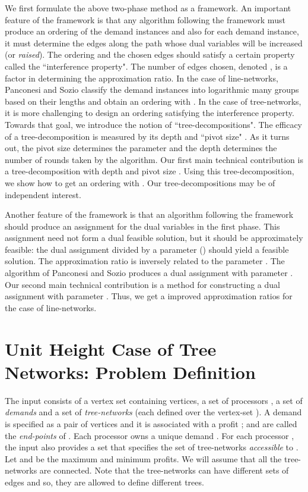 \documentclass[11pt]{article}
\begin{document}
We first formulate the above two-phase method as a framework.
An important feature of the framework is that any algorithm following the framework
must produce an ordering of the demand instances and also for each demand instance,
it must determine the edges along the path whose dual variables will be increased (or {\em raised}).
The ordering and the chosen edges should satisfy a certain property called the ``interference property".
The number of edges chosen, denoted , is a factor in determining the approximation ratio.
In the case of line-networks, Panconesi and Sozio \cite{Pancj} 
classify the demand instances into logarithmic many groups based on their lengths
and obtain an ordering with .
In the case of tree-networks, it is more challenging to design an ordering
satisfying the interference property. Towards that goal, we introduce the notion of
``tree-decompositions". 
The efficacy of a tree-decomposition is measured by its
depth and ``pivot size" . As it turns out, the pivot size  determines the parameter 
and the depth determines the number of rounds taken by the algorithm. 
Our first main technical contribution is a tree-decomposition with depth  and
pivot size . Using this tree-decomposition, we show how to get an ordering with .
Our tree-decompositions may be of independent interest.

Another feature of the framework is that an algorithm following the framework should
produce an assignment for the dual variables in the first phase.
This assignment need not form a dual feasible solution, but it should be approximately feasible:
the dual assignment divided by a parameter  () should yield a
feasible solution. The approximation ratio is inversely related to the parameter .
The algorithm of Panconesi and Sozio \cite{Pancj} produces a dual assignment with parameter 
. Our second main technical contribution is a method
for constructing a dual assignment with parameter .
Thus, we get a improved approximation ratios for the case
of line-networks.

\section{Unit Height Case of Tree Networks: Problem Definition}
The input consists of a vertex set  containing  vertices,
a set of  processors , a set of  {\em demands}  and
a set of  {\em tree-networks}  (each defined over the vertex-set ).
A demand  is specified as a pair of vertices  
and it is associated with a profit ;
 and  are called the {\em end-points} of .
Each processor  owns a unique demand .
For each processor , the input also provides a set 
that specifies the set of tree-networks {\em accessible} to .
Let  and  be the maximum and minimum profits.
We will assume that all the tree-networks are connected. 
Note that the tree-networks can have different sets of edges and so, they are allowed to define different trees.
\end{document}
